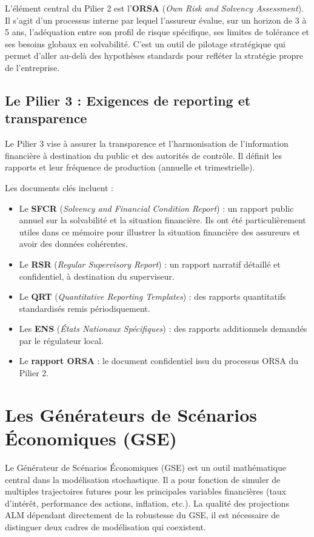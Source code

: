 L'élément central du Pilier 2 est l'\textbf{ORSA} (\textit{Own Risk and Solvency Assessment}). Il s'agit d'un processus interne par lequel l'assureur évalue, sur un horizon de 3 à 5 ans, l'adéquation entre son profil de risque spécifique, ses limites de tolérance et ses besoins globaux en solvabilité. C'est un outil de pilotage stratégique qui permet d'aller au-delà des hypothèses standards pour refléter la stratégie propre de l'entreprise.
\subsection{Le Pilier 3 : Exigences de reporting et transparence}

Le Pilier 3 vise à assurer la transparence et l'harmonisation de l'information financière à destination du public et des autorités de contrôle. Il définit les rapports et leur fréquence de production (annuelle et trimestrielle).

\bigskip

Les documents clés incluent :
\begin{itemize}
    \item Le \textbf{SFCR} (\textit{Solvency and Financial Condition Report}) : un rapport public annuel sur la solvabilité et la situation financière. Ils ont été particulièrement utiles dans ce mémoire pour illustrer la situation financière des assureurs et avoir des données cohérentes.
        \item Le \textbf{RSR} (\textit{Regular Supervisory Report}) : un rapport narratif détaillé et confidentiel, à destination du superviseur.
        \item Le \textbf{QRT} (\textit{Quantitative Reporting Templates}) : des rapports quantitatifs standardisés remis périodiquement.
        \item Les \textbf{ENS} (\textit{États Nationaux Spécifiques}) : des rapports additionnels demandés par le régulateur local.
        \item Le \textbf{rapport ORSA} : le document confidentiel issu du processus ORSA du Pilier 2.
\end{itemize}

\section{Les Générateurs de Scénarios Économiques (GSE)}
\label{sec:gse}

Le Générateur de Scénarios Économiques (GSE) est un outil mathématique central dans la modélisation stochastique. Il a pour fonction de simuler de multiples trajectoires futures pour les principales variables financières (taux d'intérêt, performance des actions, inflation, etc.). La qualité des projections ALM dépendant directement de la robustesse du GSE, il est nécessaire de distinguer deux cadres de modélisation qui coexistent.

